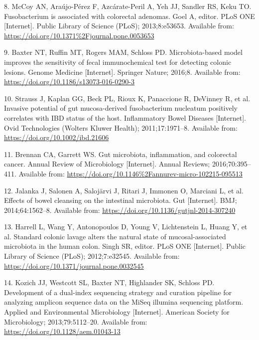 \documentclass[12pt,]{article}
\begin{document}
\hypertarget{ref-McCoy_2013}{}
8. McCoy AN, Araújo-Pérez F, Azcárate-Peril A, Yeh JJ, Sandler RS, Keku
TO. Fusobacterium is associated with colorectal adenomas. Goel A,
editor. PLoS ONE {[}Internet{]}. Public Library of Science (PLoS);
2013;8:e53653. Available from:
\url{https://doi.org/10.1371\%2Fjournal.pone.0053653}

\hypertarget{ref-Baxter2016}{}
9. Baxter NT, Ruffin MT, Rogers MAM, Schloss PD. Microbiota-based model
improves the sensitivity of fecal immunochemical test for detecting
colonic lesions. Genome Medicine {[}Internet{]}. Springer Nature;
2016;8. Available from: \url{https://doi.org/10.1186/s13073-016-0290-3}

\hypertarget{ref-Strauss2011}{}
10. Strauss J, Kaplan GG, Beck PL, Rioux K, Panaccione R, DeVinney R, et
al. Invasive potential of gut mucosa-derived fusobacterium nucleatum
positively correlates with IBD status of the host. Inflammatory Bowel
Diseases {[}Internet{]}. Ovid Technologies (Wolters Kluwer Health);
2011;17:1971--8. Available from: \url{https://doi.org/10.1002/ibd.21606}

\hypertarget{ref-Brennan_2016}{}
11. Brennan CA, Garrett WS. Gut microbiota, inflammation, and colorectal
cancer. Annual Review of Microbiology {[}Internet{]}. Annual Reviews;
2016;70:395--411. Available from:
\url{https://doi.org/10.1146\%2Fannurev-micro-102215-095513}

\hypertarget{ref-Jalanka2014}{}
12. Jalanka J, Salonen A, Salojärvi J, Ritari J, Immonen O, Marciani L,
et al. Effects of bowel cleansing on the intestinal microbiota. Gut
{[}Internet{]}. BMJ; 2014;64:1562--8. Available from:
\url{https://doi.org/10.1136/gutjnl-2014-307240}

\hypertarget{ref-Harrell2012}{}
13. Harrell L, Wang Y, Antonopoulos D, Young V, Lichtenstein L, Huang Y,
et al. Standard colonic lavage alters the natural state of
mucosal-associated microbiota in the human colon. Singh SR, editor. PLoS
ONE {[}Internet{]}. Public Library of Science (PLoS); 2012;7:e32545.
Available from: \url{https://doi.org/10.1371/journal.pone.0032545}

\hypertarget{ref-Kozich2013}{}
14. Kozich JJ, Westcott SL, Baxter NT, Highlander SK, Schloss PD.
Development of a dual-index sequencing strategy and curation pipeline
for analyzing amplicon sequence data on the MiSeq illumina sequencing
platform. Applied and Environmental Microbiology {[}Internet{]}.
American Society for Microbiology; 2013;79:5112--20. Available from:
\url{https://doi.org/10.1128/aem.01043-13}
\end{document}

